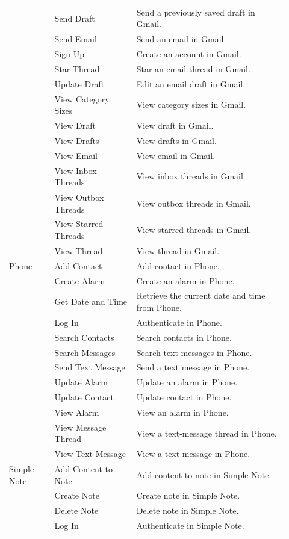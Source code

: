 \begin{longtable}{@{}p{0.15\linewidth}p{0.27\linewidth}p{0.50\linewidth}@{}}
 & Send Draft & Send a previously saved draft in Gmail. \\
 & Send Email & Send an email in Gmail. \\
 & Sign Up & Create an account in Gmail. \\
 & Star Thread & Star an email thread in Gmail. \\
 & Update Draft & Edit an email draft in Gmail. \\
 & View Category Sizes & View category sizes in Gmail. \\
 & View Draft & View draft in Gmail. \\
 & View Drafts & View drafts in Gmail. \\
 & View Email & View email in Gmail. \\
 & View Inbox Threads & View inbox threads in Gmail. \\
 & View Outbox Threads & View outbox threads in Gmail. \\
 & View Starred Threads & View starred threads in Gmail. \\
 & View Thread & View thread in Gmail. \\
\midrule
Phone & Add Contact & Add contact in Phone. \\
 & Create Alarm & Create an alarm in Phone. \\
 & Get Date and Time & Retrieve the current date and time from Phone. \\
 & Log In & Authenticate in Phone. \\
 & Search Contacts & Search contacts in Phone. \\
 & Search Messages & Search text messages in Phone. \\
 & Send Text Message & Send a text message in Phone. \\
 & Update Alarm & Update an alarm in Phone. \\
 & Update Contact & Update contact in Phone. \\
 & View Alarm & View an alarm in Phone. \\
 & View Message Thread & View a text-message thread in Phone. \\
 & View Text Message & View a text message in Phone. \\
\midrule
Simple Note & Add Content to Note & Add content to note in Simple Note. \\
 & Create Note & Create note in Simple Note. \\
 & Delete Note & Delete note in Simple Note. \\
 & Log In & Authenticate in Simple Note. \\

\end{longtable}
